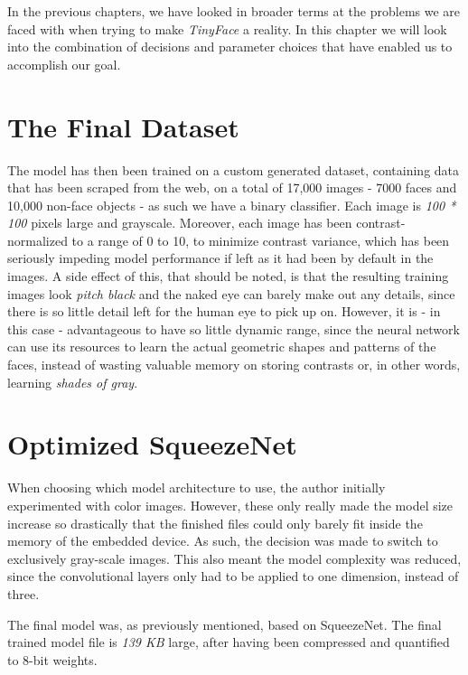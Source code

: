 In the previous chapters, we have looked in broader terms at the problems we are faced with when trying to make \textit{TinyFace} a reality. In this chapter we will look into the combination of decisions and parameter choices that have enabled us to accomplish our goal.

\section{The Final Dataset}
The model has then been trained on a custom generated dataset, containing data that has been scraped from the web, on a total of 17,000 images - 7000 faces and 10,000 non-face objects - as such we have a binary classifier. Each image is \textit{100 * 100} pixels large and grayscale. Moreover, each image has been contrast-normalized to a range of 0 to 10, to minimize contrast variance, which has been seriously impeding model performance if left as it had been by default in the images. A side effect of this, that should be noted, is that the resulting training images look \textit{pitch black} and the naked eye can barely make out any details, since there is so little detail left for the human eye to pick up on. However, it is - in this case - advantageous to have so little dynamic range, since the neural network can use its resources to learn the actual geometric shapes and patterns of the faces, instead of wasting valuable memory on storing contrasts or, in other words, learning \textit{shades of gray}. \par

\section{Optimized SqueezeNet}
When choosing which model architecture to use, the author initially experimented with color images. However, these only really made the model size increase so drastically that the finished files could only barely fit inside the memory of the embedded device. As such, the decision was made to switch to exclusively gray-scale images. This also meant the model complexity was reduced, since the convolutional layers only had to be applied to one dimension, instead of three. \par
The final model was, as previously mentioned, based on SqueezeNet. The final trained model file is \textit{139 KB} large, after having been compressed and quantified to 8-bit weights. \par
